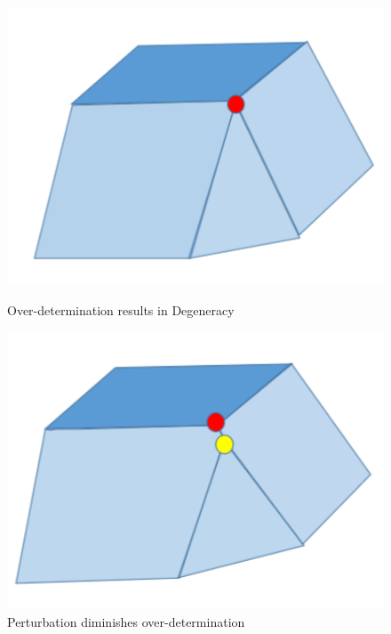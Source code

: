 \begin{figure}
\centering
\begin{minipage}[t]{0.48\textwidth}
\centering
\includegraphics[width=1\textwidth]{Second_lecture/p_2}
\caption{Over-determination results in Degeneracy}
\label{fig:2:2}
\end{minipage}
\begin{minipage}[t]{0.48\textwidth}
\centering
\includegraphics[width=1\textwidth]{Second_lecture/p_3}
\caption{Perturbation diminishes over-determination}
\label{fig:2:3}
\end{minipage}
\end{figure}

